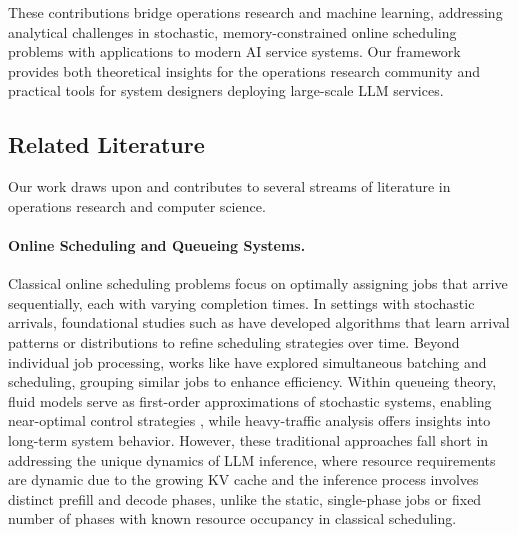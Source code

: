 These contributions bridge operations research and machine learning, addressing analytical challenges in stochastic, memory-constrained online scheduling problems with applications to modern AI service systems. Our framework provides both theoretical insights for the operations research community and practical tools for system designers deploying large-scale LLM services.

\subsection{Related Literature}

Our work draws upon and contributes to several streams of literature in operations research and computer science.

\paragraph{Online Scheduling and Queueing Systems.} 
Classical online scheduling problems focus on optimally assigning jobs that arrive sequentially, each with varying completion times. In settings with stochastic arrivals, foundational studies such as \citet{devanur2009adwords,vee2010optimal,cole2014sample,balkanski2016power,lattanzi2020online} have developed algorithms that learn arrival patterns or distributions to refine scheduling strategies over time. Beyond individual job processing, works like \citet{im2013online,lucier2013efficient,liu2015online,li2020online} have explored simultaneous batching and scheduling, grouping similar jobs to enhance efficiency. Within queueing theory, fluid models serve as first-order approximations of stochastic systems, enabling near-optimal control strategies \citep{mandelbaum1998strong,maglaras2000discrete,bauerle2002optimal,liu2011network}, while heavy-traffic analysis offers insights into long-term system behavior. However, these traditional approaches fall short in addressing the unique dynamics of LLM inference, where resource requirements are dynamic due to the growing KV cache and the inference process involves distinct prefill and decode phases, unlike the static, single-phase jobs or fixed number of phases with known resource occupancy in classical scheduling.

